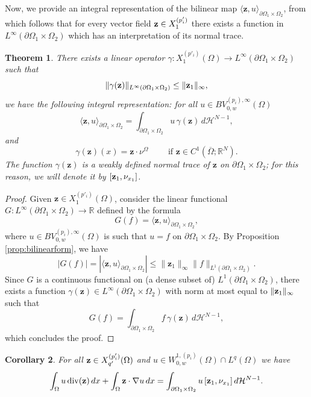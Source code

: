 \documentclass[reqno,12pt]{amsart}
\def\z{{\bf z}}
\newtheorem{theorem}{Theorem}[section]
\newtheorem{corollary}[theorem]{Corollary}
\numberwithin{equation}{section}
\begin{document}
Now, we provide an integral representation of the bilinear map $\langle \mathbf{z}, u \rangle_{\partial\Omega_1 \times \Omega_2}$, from which follows that for every vector field $\z \in X_1^{(p'_i)}$ there exists a function in $L^\infty(\partial\Omega_1 \times \Omega_2)$ which has an interpretation of its normal trace.

\begin{theorem}\label{thm:definitionofweaktrace}
There exists a linear operator $\gamma: X_1^{(p'_i)}(\Omega) \rightarrow L^\infty(\partial\Omega_1 \times \Omega_2)$ such that
$$ \| \gamma(\mathbf{z}) \|_{L^\infty(\partial\Omega_1 \times \Omega_2)} \leq \| \z_1 \|_{\infty},$$
we have the following integral representation: for all $u \in BV_{0,w}^{(p_i), \infty}(\Omega)$ 
\begin{equation}\label{eq:integralrepresentation}
\langle \mathbf{z}, u \rangle_{\partial\Omega_1 \times \Omega_2} = \int_{\partial\Omega_1 \times \Omega_2} u \, \gamma(\mathbf{z}) \, d\mathcal{H}^{N-1},    
\end{equation}
and
$$ \gamma(\mathbf{z}) (x) = \mathbf{z} \cdot \nu^\Omega \qquad \mbox{ if } \mathbf{z} \in C^1(\overline{\Omega}; \mathbb{R}^N).$$
The function $\gamma(\mathbf{z})$ is a weakly defined normal trace of $\mathbf{z}$ on $\partial\Omega_1 \times \Omega_2$; for this reason, we will denote it by $[\z_1, \nu_{x_1}]$.
\end{theorem}

\begin{proof}
Given $\mathbf{z} \in X_1^{(p'_i)}(\Omega)$, consider the linear functional $G: L^\infty(\partial\Omega_1 \times \Omega_2) \rightarrow \mathbb{R}$ defined by the formula
$$ G(f) = \langle \mathbf{z}, u \rangle_{\partial\Omega_1 \times \Omega_2},$$
where $u \in BV_{0,w}^{(p_i), \infty}(\Omega)$ is such that $u = f$ on $\partial\Omega_1 \times \Omega_2$. By Proposition \ref{prop:bilinearform}, we have
$$ |G(f)| = |\langle \mathbf{z}, u \rangle_{\partial\Omega_1 \times \Omega_2}| \leq \| \mathbf{z}_1 \|_{\infty} \| f \|_{L^1(\partial\Omega_1 \times \Omega_2)}.$$
Since $G$ is a continuous functional on (a dense subset of) $L^1(\partial\Omega_1 \times \Omega_2)$, there exists a function $\gamma(\mathbf{z}) \in L^\infty(\partial\Omega_1 \times \Omega_2)$ with norm at most equal to $\| \z_1 \|_{\infty}$ such that
$$ G(f) = \int_{\partial\Omega_1 \times \Omega_2} f \, \gamma(\mathbf{z}) \, d\mathcal{H}^{N-1},$$
which concludes the proof.
\end{proof}

\begin{corollary}\label{cor:greenformulaforsobolevfunctions}
For all $\z \in X_{q'}^{(p'_i)}(\Omega)$ and $u \in W_{0,w}^{1,(p_i)}(\Omega) \cap L^q(\Omega)$ we have
\begin{equation}
\int_{\Omega} u \, \mathrm{div}(\z) \, dx + \int_\Omega \z \cdot \nabla u \, dx = \int_{\partial\Omega_1 \times \Omega_2} u \, [\z_1, \nu_{x_1}] \,d\mathcal{H}^{N-1}.
\end{equation}
\end{corollary}
\end{document}
